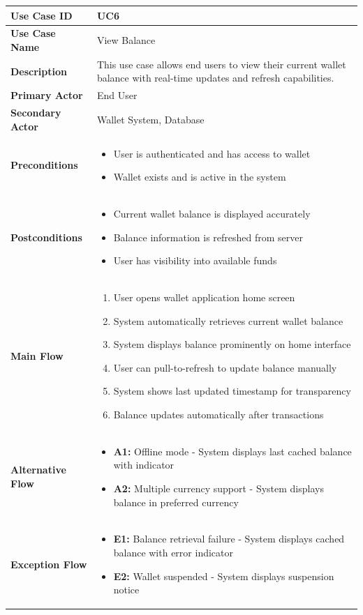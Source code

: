 \begin{longtable}{|p{3cm}|p{11cm}|}
\hline
\textbf{Use Case ID} & UC6 \\
\hline
\textbf{Use Case Name} & View Balance \\
\hline
\textbf{Description} & This use case allows end users to view their current wallet balance with real-time updates and refresh capabilities. \\
\hline
\textbf{Primary Actor} & End User \\
\hline
\textbf{Secondary Actor} & Wallet System, Database \\
\hline
\textbf{Preconditions} & 
\begin{itemize}[nosep,leftmargin=*]
\item User is authenticated and has access to wallet
\item Wallet exists and is active in the system
\end{itemize} \\
\hline
\textbf{Postconditions} & 
\begin{itemize}[nosep,leftmargin=*]
\item Current wallet balance is displayed accurately
\item Balance information is refreshed from server
\item User has visibility into available funds
\end{itemize} \\
\hline
\textbf{Main Flow} & 
\begin{enumerate}[nosep,leftmargin=*]
\item User opens wallet application home screen
\item System automatically retrieves current wallet balance
\item System displays balance prominently on home interface
\item User can pull-to-refresh to update balance manually
\item System shows last updated timestamp for transparency
\item Balance updates automatically after transactions
\end{enumerate} \\
\hline
\textbf{Alternative Flow} & 
\begin{itemize}[nosep,leftmargin=*]
\item \textbf{A1:} Offline mode - System displays last cached balance with indicator
\item \textbf{A2:} Multiple currency support - System displays balance in preferred currency
\end{itemize} \\
\hline
\textbf{Exception Flow} & 
\begin{itemize}[nosep,leftmargin=*]
\item \textbf{E1:} Balance retrieval failure - System displays cached balance with error indicator
\item \textbf{E2:} Wallet suspended - System displays suspension notice
\end{itemize} \\
\hline
\end{longtable}

